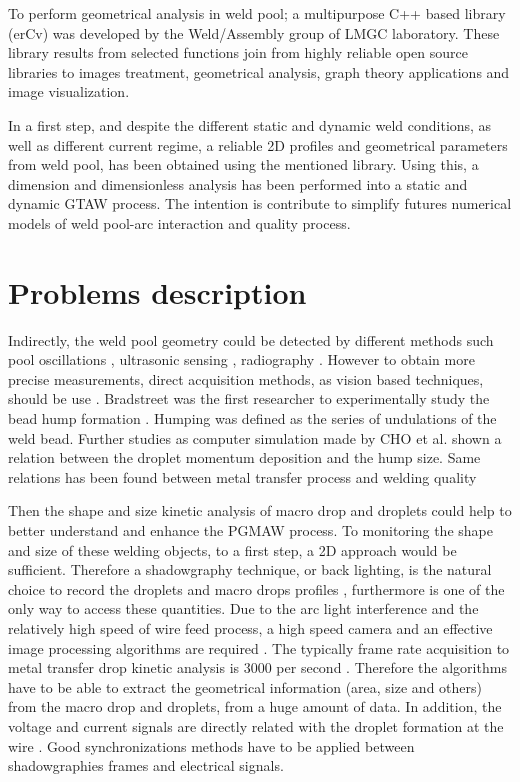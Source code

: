 To perform geometrical analysis in weld pool; a multipurpose
 C++ based library (erCv) was developed by the Weld/Assembly
 group of LMGC laboratory. These library results from
 selected functions join from highly reliable open source
 libraries to images treatment, geometrical analysis, 
graph theory applications and image visualization.

In a first step, and despite the different static and dynamic 
weld conditions, as well as different current regime, a 
reliable 2D profiles and geometrical parameters from weld
 pool, has been obtained using the mentioned library. 
Using this, a dimension and dimensionless analysis has 
been performed into a static and dynamic GTAW process. 
The intention is contribute to simplify futures numerical
 models of weld pool-arc interaction and quality process.



\section{Problems description}
\label{problem_description}

Indirectly, the weld pool geometry could be detected 
by different methods such pool oscillations \cite{RENWICK}, 
ultrasonic sensing \cite{CARLSON}, radiography \cite{ROKHLIN}.
 However to obtain more precise measurements, direct 
acquisition methods, as vision based techniques, should 
be use \cite{KOVACEVIC}.     Bradstreet was the first 
researcher to experimentally study the bead hump formation
 \cite{CHO}. Humping was defined as the series of 
undulations of the weld bead. Further studies as computer
 simulation made by CHO et al. \cite{CHO} shown a relation
 between the droplet momentum deposition and the hump size.
 Same relations has been found between metal transfer process
 and welding quality \cite{}

Then the shape and size kinetic analysis of macro drop and 
droplets could help to better understand and enhance the PGMAW 
process. To monitoring the shape and size of these welding 
objects, to a first step, a 2D approach would be sufficient.
 Therefore a shadowgraphy technique, or back lighting, is 
the natural choice to record the droplets and macro drops 
profiles \cite{BALSAMO}, furthermore is one of the only way
 to access these quantities. Due to the arc light interference
 and the relatively high speed of wire feed process, a high
 speed camera and an effective image processing algorithms 
are required \cite{WANG}. The typically frame rate acquisition
 to metal transfer drop kinetic analysis is $3000$ per second 
\cite{WANG}. Therefore the algorithms have to be able to extract
 the geometrical information (area, size and others) from 
the macro drop and droplets, from a huge amount of data. 
In addition, the voltage and current signals are directly
 related with the droplet formation at the wire \cite{BALSAMO}.
 Good synchronizations methods have to be applied between 
shadowgraphies frames and electrical signals.



